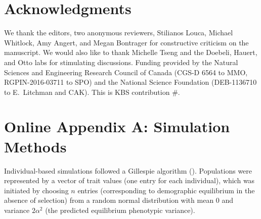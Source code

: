 \documentclass[11pt]{article}
\begin{document}
\section*{Acknowledgments}

We thank the editors, two anonymous reviewers, Stilianos Louca, Michael Whitlock, Amy Angert, and Megan Bontrager for constructive criticism on the manuscript.
We would also like to thank Michelle Tseng and the Doebeli, Hauert, and Otto labs for stimulating discussions.
Funding provided by the Natural Sciences and Engineering Research Council of Canada (CGS-D 6564 to MMO, RGPIN-2016-03711 to SPO) and the National Science Foundation (DEB-1136710 to E.\ Litchman and CAK).
This is KBS contribution \#.


\renewcommand{\thesection}{\Alph{section}}






\section*{Online Appendix A: Simulation Methods}
\label{app:sims}

\renewcommand{\theequation}{A\arabic{equation}}
\setcounter{equation}{0}  %
\renewcommand{\thetable}{A\arabic{table}}
\setcounter{figure}{0}
\setcounter{table}{0}

Individual-based simulations followed a Gillespie algorithm (\citealt{Gillespie1977}).
Populations were represented by a vector of trait values (one entry for each individual), which was initiated by choosing $n$ entries (corresponding to demographic equilibrium in the absence of selection) from a random normal distribution with mean 0 and variance $2 \alpha^2$ (the predicted equilibrium phenotypic variance).
\end{document}
